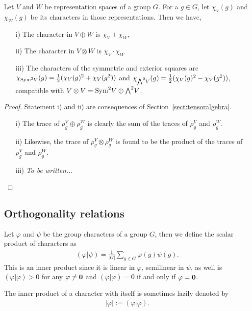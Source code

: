 \begin{proposition}\label{prop:charplustimes}
	Let $V$ and $W$ be representation spaces of a group $G$. For a $g \in G$, let $\chi_V(g)$ and $\chi_W(g)$ be its characters in those representations. Then we have,
	\begin{enumerate}
		\item[i)] The character in $V \oplus W$ is $\chi_V+\chi_W$,
		\item[ii)] The character in $V \otimes W$ is $\chi_V \cdot \chi_W$
		\item[iii)] The characters of the symmetric and exterior squares are $\chi_{\text{Sym}^2 V}(g) = \frac{1}{2}(\chi_V(g)^2 + \chi_V(g^2))$ and $\chi_{{\bigwedge}^2 V}(g) = \frac{1}{2}(\chi_V(g)^2 - \chi_V(g^2))$, compatible with $V \otimes V = \text{Sym}^2 V \oplus {\bigwedge}^2 V$.
	\end{enumerate}
\end{proposition}
\begin{proof}
	Statement i) and ii) are consequences of Section~\ref{sect:tensoralgebra}. 
	\begin{enumerate}
		\item[i)] The trace of $\rho_g^V \oplus \rho_g^W$ is clearly the sum of the traces of $\rho_g^V$ and $\rho_g^W$.
		\item[ii)] Likewise, the trace of $\rho_g^V \otimes \rho_g^W$ is found to be the product of the traces of $\rho_g^V$ and $\rho_g^W$.
		\item[iii)] \textit{To be written...} \qedhere
	\end{enumerate}
\end{proof}

\subsection{Orthogonality relations}

Let $\varphi$ and $\psi$ be the group characters of a group $G$, then we define the scalar product of characters as
\begin{align*}
	(\varphi | \psi) = \frac{1}{|G|} \sum_{g \in G} \varphi(g) \overline{\psi(g)}.
\end{align*}
This is an inner product since it is linear in $\varphi$, semilinear in $\psi$, as well is $(\varphi|\varphi) > 0 $ for any $\varphi \neq \mathbf{0}$ and $(\varphi|\varphi)=0$ if and only if $\varphi= \mathbf{0}$.

\begin{notation}
	The inner product of a character with itself is sometimes lazily denoted by \begin{align*}
		|\varphi| := (\varphi|\varphi).
	\end{align*}
\end{notation}

